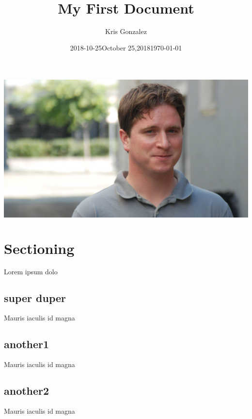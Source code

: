 \documentclass[a4paper,12pt]{article} %
\begin{document}
\title{My First Document}
\author{Kris Gonzalez}
\date{2018-10-25}
\date{October 25,2018}
\date{\today} %
\maketitle
{} %



\includegraphics[width=1\textwidth]{media/titleimg.jpg} %

\newpage
\tableofcontents




\twocolumn %

\section{Sectioning}
\label{Sectioning}

Lorem ipsum dolo
\subsection{super duper}
\label{super duper}
Mauris iaculis id magna 
\subsection{another1}
Mauris iaculis id magna 
\subsection{another2}
Mauris iaculis id magna
\end{document}
